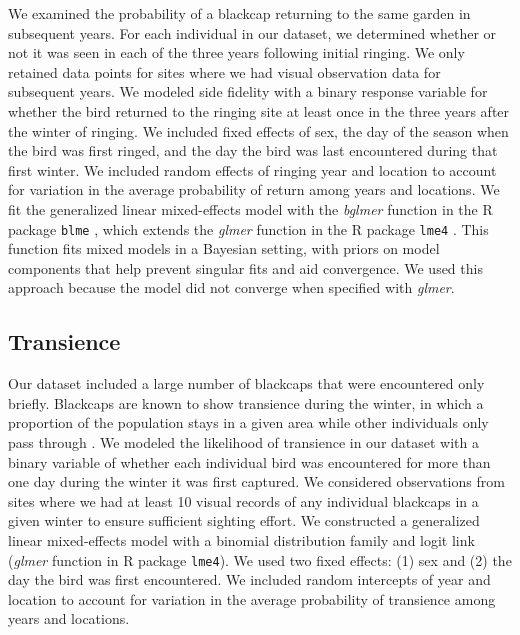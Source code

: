 \documentclass[a4paper, twoside]{templates/ociamthesis}
\begin{document}
We examined the probability of a blackcap returning to the same garden in subsequent years. For each individual in our dataset, we determined whether or not it was seen in each of the three years following initial ringing. We only retained data points for sites where we had visual observation data for subsequent years. We modeled side fidelity with a binary response variable for whether the bird returned to the ringing site at least once in the three years after the winter of ringing. We included fixed effects of sex, the day of the season when the bird was first ringed, and the day the bird was last encountered during that first winter. We included random effects of ringing year and location to account for variation in the average probability of return among years and locations. We fit the generalized linear mixed-effects model with the \emph{bglmer} function in the R package \texttt{blme} \autocite{chungNondegeneratePenalizedLikelihood2013}, which extends the \emph{glmer} function in the R package \texttt{lme4} \autocite{batesFittingLinearMixedeffects2015}. This function fits mixed models in a Bayesian setting, with priors on model components that help prevent singular fits and aid convergence. We used this approach because the model did not converge when specified with \emph{glmer}.

\hypertarget{transience}{%
\subsection{Transience}\label{transience}}

Our dataset included a large number of blackcaps that were encountered only briefly. Blackcaps are known to show transience during the winter, in which a proportion of the population stays in a given area while other individuals only pass through \autocite{beldaResidentTransientDynamics2007,cuadradoYearYearRecurrence1992}. We modeled the likelihood of transience in our dataset with a binary variable of whether each individual bird was encountered for more than one day during the winter it was first captured. We considered observations from sites where we had at least 10 visual records of any individual blackcaps in a given winter to ensure sufficient sighting effort. We constructed a generalized linear mixed-effects model with a binomial distribution family and logit link (\emph{glmer} function in R package \texttt{lme4}). We used two fixed effects: (1) sex and (2) the day the bird was first encountered. We included random intercepts of year and location to account for variation in the average probability of transience among years and locations.
\end{document}
